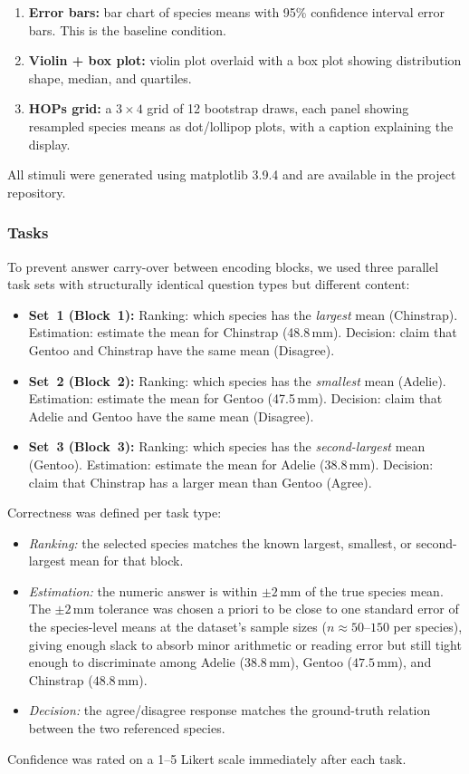 \documentclass{article}
\begin{document}
\begin{enumerate}[leftmargin=*, itemsep=4pt]
\item \textbf{Error bars:} bar chart of species means with 95\%
  confidence interval error bars.  This is the baseline condition.
\item \textbf{Violin + box plot:} violin plot overlaid with a box plot
  showing distribution shape, median, and quartiles.
\item \textbf{HOPs grid:} a $3 \times 4$ grid of 12 bootstrap draws,
  each panel showing resampled species means as dot/lollipop plots,
  with a caption explaining the display.
\end{enumerate}

All stimuli were generated using matplotlib 3.9.4 and are available in
the project repository.

\subsubsection*{Tasks}

To prevent answer carry-over between encoding blocks, we used three
parallel task sets with structurally identical question types but
different content:

\begin{itemize}[leftmargin=*, itemsep=4pt]
\item \textbf{Set~1 (Block~1):} Ranking: which species has the
  \emph{largest} mean (Chinstrap).  Estimation: estimate the mean for
  Chinstrap (48.8\,mm).  Decision: claim that Gentoo and Chinstrap
  have the same mean (Disagree).
\item \textbf{Set~2 (Block~2):} Ranking: which species has the
  \emph{smallest} mean (Adelie).  Estimation: estimate the mean for
  Gentoo (47.5\,mm).  Decision: claim that Adelie and Gentoo have the
  same mean (Disagree).
\item \textbf{Set~3 (Block~3):} Ranking: which species has the
  \emph{second-largest} mean (Gentoo).  Estimation: estimate the mean
  for Adelie (38.8\,mm).  Decision: claim that Chinstrap has a larger
  mean than Gentoo (Agree).
\end{itemize}

Correctness was defined per task type:
\begin{itemize}[leftmargin=*, itemsep=2pt]
\item \emph{Ranking:} the selected species matches the known largest,
  smallest, or second-largest mean for that block.
\item \emph{Estimation:} the numeric answer is within $\pm 2$\,mm of
  the true species mean.  The $\pm 2$\,mm tolerance was chosen a
  priori to be close to one standard error of the species-level means
  at the dataset's sample sizes ($n \approx 50$--$150$ per species),
  giving enough slack to absorb minor arithmetic or reading error but
  still tight enough to discriminate among Adelie ($38.8$\,mm),
  Gentoo ($47.5$\,mm), and Chinstrap ($48.8$\,mm).
\item \emph{Decision:} the agree/disagree response matches the
  ground-truth relation between the two referenced species.
\end{itemize}
Confidence was rated on a 1--5 Likert scale immediately after each
task.
\end{document}
